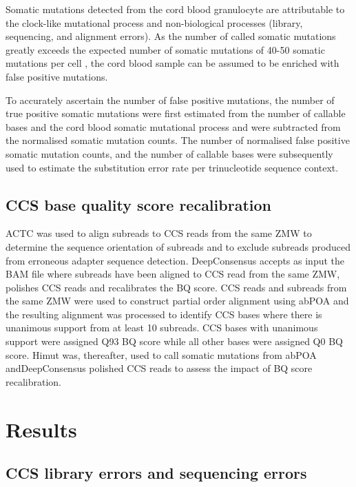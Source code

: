 Somatic mutations detected from the cord blood granulocyte are attributable to the clock-like mutational process and non-biological processes (library, sequencing, and alignment errors). As the number of called somatic mutations greatly exceeds the expected number of somatic mutations of 40-50 somatic mutations per cell \cite{Osorio2018-mh, Mitchell2022-ry}, the cord blood sample can be assumed to be enriched with false positive mutations. 

To accurately ascertain the number of false positive mutations, the number of true positive somatic mutations were first estimated from the number of callable bases and the cord blood somatic mutational process \cite{Mitchell2022-ry} and were subtracted from the normalised somatic mutation counts. The number of normalised false positive somatic mutation counts, and the number of callable bases were subsequently used to estimate the substitution error rate per trinucleotide sequence context.

\subsection{CCS base quality score recalibration}

ACTC \cite{} was used to align subreads to CCS reads from the same ZMW to determine the sequence orientation of subreads and to exclude subreads produced from erroneous adapter sequence detection. DeepConsensus accepts as input the BAM file where subreads have been aligned to CCS read from the same ZMW, polishes CCS reads and recalibrates the BQ score. CCS reads and subreads from the same ZMW were used to construct partial order alignment using abPOA \cite{Gao2021-nf} and the resulting alignment was processed to identify CCS bases where there is unanimous support from at least 10 subreads. CCS bases with unanimous support were assigned Q93 BQ score while all other bases were assigned Q0 BQ score. Himut was, thereafter, used to call somatic mutations from abPOA andDeepConsensus polished CCS reads to assess the impact of BQ score recalibration. 

\section{Results}

\subsection{CCS library errors and sequencing errors}

